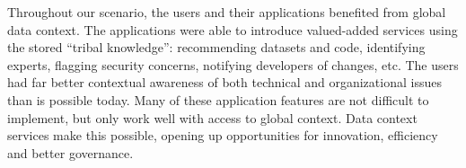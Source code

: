 \documentclass{sig-alternate}
\begin{document}
Throughout our scenario, the users and their applications benefited from global data context. 
The applications were able to introduce valued-added services using the stored ``tribal knowledge'':  recommending datasets and code, identifying experts, flagging security concerns, notifying developers of changes, etc.
The users had far better contextual awareness of both technical and organizational issues than is possible today.
Many of these application features are not difficult to implement, but only work well with access to global context. 
Data context services make this possible, opening up opportunities for innovation, efficiency and better governance.




    
    
    









\end{document}
